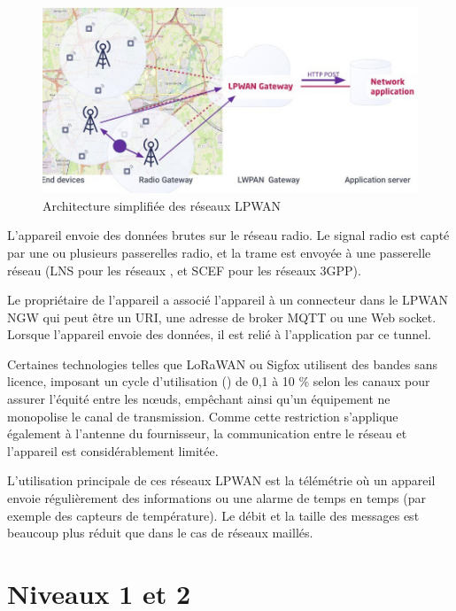 \begin{figure}[tbp]
\centerline{\includegraphics[width=1\columnwidth]{Pictures/TolologieStar.jpg}}
\caption{Architecture simplifiée des réseaux LPWAN}
\label{fig-topo-star}
\end{figure}


L’appareil envoie des données brutes sur le réseau radio. Le signal radio est capté par une ou plusieurs passerelles radio, et la trame est envoyée à une passerelle réseau (\ac{LNS}  pour les réseaux , et \ac{SCEF} pour les réseaux \ac{3GPP}).

Le propriétaire de l’appareil a associé l’appareil à un connecteur dans le LPWAN \ac{NGW} qui peut être un \ac{URI}, une adresse de broker \ac{MQTT} ou une Web socket. Lorsque l’appareil envoie des données, il est relié à l’application par ce tunnel.

    \vspace{1em}


Certaines technologies telles que LoRaWAN ou Sigfox utilisent des bandes sans licence, imposant un cycle d’utilisation () de 0,1 à 10 \% selon les canaux pour assurer l’équité entre les nœuds, empêchant ainsi qu'un équipement ne monopolise le canal de transmission. Comme cette restriction s’applique également à l’antenne du fournisseur, la communication entre le réseau et l’appareil est considérablement limitée.

L’utilisation principale de ces réseaux \ac{LPWAN} est la télémétrie où un appareil envoie régulièrement des informations ou une alarme de temps en temps (par exemple des capteurs de température). Le débit et la taille des messages est beaucoup plus réduit que dans le cas de réseaux maillés.

    \vspace{1em}

\section{Niveaux 1 et 2}

